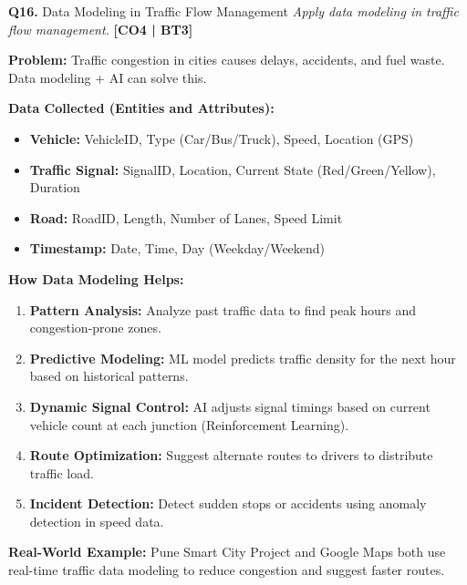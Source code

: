\documentclass[12pt,a4paper]{article}
\newcommand{\Qno}[1]{\textbf{\color{darkred}Q#1.}}
\newcommand{\term}[1]{\textbf{\color{headingcolor}#1}}
\begin{document}
\vspace{8pt}

\begin{questionbox}{\Qno{16} Data Modeling in Traffic Flow Management}
\textit{Apply data modeling in traffic flow management.} \hfill \textbf{[CO4 | BT3]}
\end{questionbox}

\begin{answerenv}

\textbf{\color{headingcolor}Problem:} Traffic congestion in cities causes delays, accidents, and fuel waste. Data modeling + AI can solve this.

\vspace{6pt}
\textbf{\color{headingcolor}Data Collected (Entities and Attributes):}
\begin{itemize}[leftmargin=1.5em, itemsep=2pt]
  \item \term{Vehicle:} VehicleID, Type (Car/Bus/Truck), Speed, Location (GPS)
  \item \term{Traffic Signal:} SignalID, Location, Current State (Red/Green/Yellow), Duration
  \item \term{Road:} RoadID, Length, Number of Lanes, Speed Limit
  \item \term{Timestamp:} Date, Time, Day (Weekday/Weekend)
\end{itemize}

\vspace{6pt}
\textbf{\color{headingcolor}How Data Modeling Helps:}
\begin{enumerate}[leftmargin=1.8em, itemsep=4pt]
  \item \term{Pattern Analysis:} Analyze past traffic data to find peak hours and congestion-prone zones.
  \item \term{Predictive Modeling:} ML model predicts traffic density for the next hour based on historical patterns.
  \item \term{Dynamic Signal Control:} AI adjusts signal timings based on current vehicle count at each junction (Reinforcement Learning).
  \item \term{Route Optimization:} Suggest alternate routes to drivers to distribute traffic load.
  \item \term{Incident Detection:} Detect sudden stops or accidents using anomaly detection in speed data.
\end{enumerate}

\begin{keypoint}
\textbf{Real-World Example:} Pune Smart City Project and Google Maps both use real-time traffic data modeling to reduce congestion and suggest faster routes.
\end{keypoint}

\end{answerenv}
\end{document}
